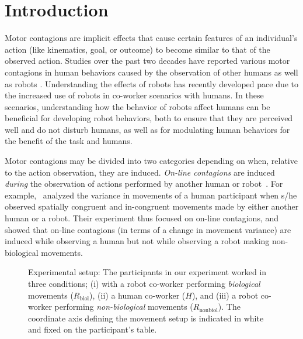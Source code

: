 \documentclass[a4paper, 12pt, oneside]{Thesis}  %
\begin{document}
\clearpage
\section{Introduction}

Motor contagions are implicit effects that cause certain features of an individual's action (like kinematics, goal, or outcome) to become similar to that of the observed action. Studies over the past two decades have reported various motor contagions in human behaviors caused by the observation of other humans as well as robots \cite{Blakemore:Neuropsychologia:2005, Fadiga:JNeuroPhys:1995, Ganesh:Springer:2015, Sciutti:IJSR:2012, Prinz:EJPAP:1997}. Understanding the effects of robots has recently developed pace due to the increased use of robots in co-worker scenarios with humans. In these scenarios, understanding how the behavior of robots affect humans can be beneficial for developing robot behaviors, both to ensure that they are perceived well and do not disturb humans, as well as for modulating human behaviors for the benefit of the task and humans.  

Motor contagions may be divided into two categories depending on when, relative to the action observation, they are induced. \emph{On-line contagions} are induced \emph{during} the observation of actions performed by another human or robot~\cite{Kupferberg:Methods:2009, Oztop:RAS_ICHR:2004, Chaminade:JPP:2009, Kupferberg:PlosOne:2012, Brass:ActaPsych:2001, Press:CBR:2005}. For example,~\cite{Kilner:CurBio:2003} analyzed the variance in movements of a human participant when s/he observed spatially congruent and in-congruent movements made by either another human or a robot. Their experiment thus focused on on-line contagions, and showed that on-line contagions (in terms of a change in movement variance) are induced while observing a human but not while observing a robot making non-biological movements.

\begin{figure}[hb]
	\caption{Experimental setup: The participants in our experiment worked in three conditions; (i) with a robot co-worker performing \textit{biological} movements ($\textit{R}_{\text{biol}}$), (ii) a human co-worker ($\textit{H}$), and (iii) a robot co-worker performing \textit{non-biological} movements ($\textit{R}_{\text{nonbiol}}$). The coordinate axis defining the movement setup is indicated in white and fixed on the participant's table.}
	\label{fig:setup}
\end{figure}
\end{document}
